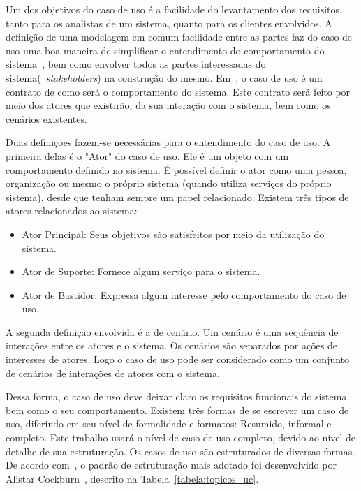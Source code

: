 Um dos objetivos do caso de uso é a facilidade do levantamento dos requisitos, tanto para os analistas de um sistema, quanto para os clientes envolvidos. A definição de uma modelagem em comum facilidade entre as partes faz do caso de uso uma boa maneira de simplificar o entendimento do comportamento do sistema~\cite{larman08}, bem como envolver todos as partes interessadas do sistema(~\emph{stakeholders}) na construção do mesmo. Em~\cite{cockburn01}, o caso de uso é um contrato de como será o comportamento do sistema. Este contrato será feito por meio dos atores que existirão, da sua interação com o sistema, bem como os cenários existentes.

Duas definições fazem-se necessárias para o entendimento do caso de uso. A primeira delas é o "Ator" do caso de uso. Ele é um objeto com um comportamento definido no sistema. É possível definir o ator como uma pessoa, organização ou mesmo o próprio sistema (quando utiliza serviços do próprio sistema), desde que tenham sempre um papel relacionado. Existem três tipos de atores relacionados ao sistema:
\begin{itemize}
	\item Ator Principal: Seus objetivos são satisfeitos por meio da utilização do sistema.
	\item Ator de Suporte: Fornece algum serviço para o sistema.
	\item Ator de Bastidor: Expressa algum interesse pelo comportamento do caso de uso.
\end{itemize}

A segunda definição envolvida é a de cenário. Um cenário é uma sequência de interações entre os atores e o sistema. Os cenários são separados por ações de interesses de atores. Logo o caso de uso pode ser considerado como um conjunto de cenários de interações de atores com o sistema.

Dessa forma, o caso de uso deve deixar claro os requisitos funcionais do sistema, bem como o seu comportamento. Existem três formas de se escrever um caso de uso, diferindo em seu nível de formalidade e formatos: Resumido, informal e completo. Este trabalho usará o nível de caso de uso completo, devido ao nível de detalhe de sua estruturação. Os casos de uso são estruturados de diversas formas. De acordo com~\cite{larman08}, o padrão de estruturação mais adotado foi desenvolvido por Alistar Cockburn~\cite{cockburn01}, descrito na Tabela~\ref{tabela:topicos_uc}.

